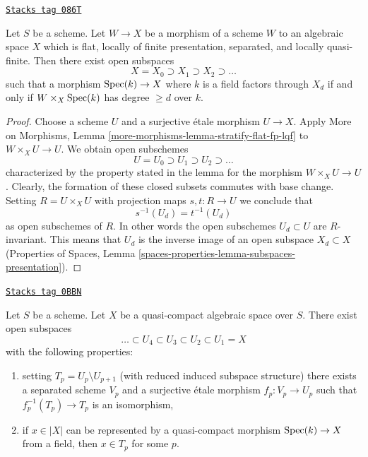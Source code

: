 \begin{lemma}
\label{decent-spaces-lemma-stratify-flat-fp-lqf}
\href{https://stacks.math.columbia.edu/tag/086T}{\texttt{Stacks tag 086T}}

Let $S$ be a scheme. Let $W \to X$ be a morphism of a scheme $W$ to an
algebraic space $X$ which is flat, locally of finite presentation,
separated, and locally quasi-finite. Then there
exist open subspaces
$$
X = X_0 \supset X_1 \supset X_2 \supset \ldots
$$
such that a morphism $\operatorname{Spec}(k) \to X$ where $k$ is a field
factors through $X_d$ if and
only if $W \times_X \operatorname{Spec}(k)$ has degree $\geq d$ over $k$.
\end{lemma}

\begin{proof}
Choose a scheme $U$ and a surjective \'etale morphism $U \to X$. Apply
More on Morphisms, Lemma \ref{more-morphisms-lemma-stratify-flat-fp-lqf}
to $W \times_X U \to U$. We obtain open subschemes
$$
U = U_0 \supset U_1 \supset U_2 \supset \ldots
$$
characterized by the property stated in the lemma for the morphism
$W \times_X U \to U$. Clearly, the formation of these closed subsets commutes
with base change. Setting $R = U \times_X U$ with projection maps
$s, t : R \to U$ we conclude that
$$
s^{-1}(U_d) = t^{-1}(U_d)
$$
as open subschemes of $R$. In other words the open subschemes $U_d \subset U$
are $R$-invariant. This means that $U_d$ is the inverse image of an
open subspace $X_d \subset X$
(Properties of Spaces, Lemma
\ref{spaces-properties-lemma-subspaces-presentation}).
\end{proof}

\begin{lemma}
\label{decent-spaces-lemma-filter-quasi-compact}
\href{https://stacks.math.columbia.edu/tag/0BBN}{\texttt{Stacks tag 0BBN}}

Let $S$ be a scheme. Let $X$ be a quasi-compact algebraic space
over $S$. There exist open subspaces
$$
\ldots \subset U_4 \subset U_3 \subset U_2 \subset U_1 = X
$$
with the following properties:
\begin{enumerate}
\item setting $T_p = U_p \setminus U_{p + 1}$ (with reduced induced subspace
structure) there exists a separated scheme $V_p$ and a surjective \'etale
morphism $f_p : V_p \to U_p$ such that $f_p^{-1}(T_p) \to T_p$ is an
isomorphism,
\item if $x \in |X|$ can be represented by a quasi-compact morphism
$\operatorname{Spec}(k) \to X$ from a field, then $x \in T_p$ for some $p$.
\end{enumerate}
\end{lemma}

